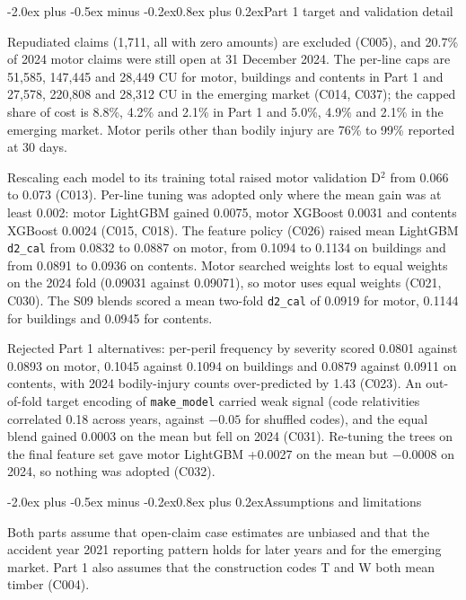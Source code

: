 \documentclass[11pt,a4paper]{article}
\makeatletter
\renewcommand\section{\@startsection{section}{1}{\z@}%
  {-2.0ex plus -0.5ex minus -0.2ex}{0.8ex plus 0.2ex}{\normalfont\large\bfseries}}
\newcommand{\code}[1]{\texttt{#1}}
\newcommand{\Dsq}{D$^2$}
\makeatother
\begin{document}
\section{Part 1 target and validation detail}

Repudiated claims (1,711, all with zero amounts) are excluded (C005), and 20.7\% of 2024 motor claims were still open
at 31 December 2024. The per-line caps are 51,585, 147,445 and 28,449 CU for motor, buildings and contents in Part 1
and 27,578, 220,808 and 28,312 CU in the emerging market (C014, C037); the capped share of cost is 8.8\%, 4.2\% and
2.1\% in Part 1 and 5.0\%, 4.9\% and 2.1\% in the emerging market. Motor perils other than bodily injury are 76\% to
99\% reported at 30 days.

Rescaling each model to its training total raised motor validation \Dsq{} from 0.066 to 0.073 (C013). Per-line tuning was
adopted only where the mean gain was at least 0.002: motor LightGBM gained 0.0075, motor XGBoost 0.0031 and contents
XGBoost 0.0024 (C015, C018). The feature policy (C026) raised mean LightGBM \code{d2\_cal} from 0.0832 to 0.0887 on
motor, from 0.1094 to 0.1134 on buildings and from 0.0891 to 0.0936 on contents. Motor searched weights lost to equal
weights on the 2024 fold (0.09031 against 0.09071), so motor uses equal weights (C021, C030). The S09 blends scored a
mean two-fold \code{d2\_cal} of 0.0919 for motor, 0.1144 for buildings and 0.0945 for contents.

Rejected Part 1 alternatives: per-peril frequency by severity scored 0.0801 against 0.0893 on motor, 0.1045 against
0.1094 on buildings and 0.0879 against 0.0911 on contents, with 2024 bodily-injury counts over-predicted by 1.43 (C023).
An out-of-fold target encoding of \code{make\_model} carried weak signal (code relativities correlated 0.18 across years,
against $-0.05$ for shuffled codes), and the equal blend gained 0.0003 on the mean but fell on 2024 (C031). Re-tuning
the trees on the final feature set gave motor LightGBM +0.0027 on the mean but $-0.0008$ on 2024, so nothing was adopted
(C032).

\section{Assumptions and limitations}
\label{app:lim}

Both parts assume that open-claim case estimates are unbiased and that the accident year 2021 reporting pattern holds
for later years and for the emerging market. Part 1 also assumes that the construction codes T and W both mean timber
(C004).
\end{document}
